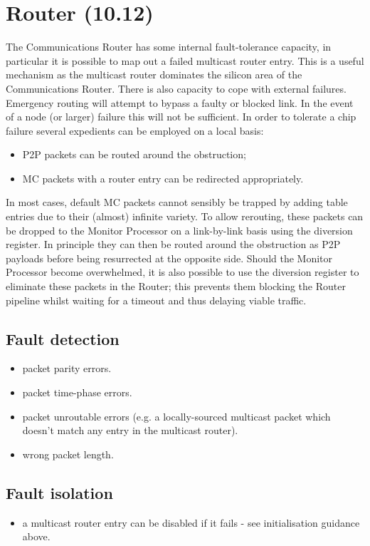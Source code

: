 \documentclass[oneside, a4paper, 11pt]{memoir}
\newenvironment{itmz}{
	\begin{itemize}
		\setlength{\itemsep}{0pt}
		\setlength{\parskip}{0pt}
	}{\end{itemize}}
\begin{document}
\section{Router (10.12)}
The Communications Router has some internal fault-tolerance capacity, in particular it is possible
to map out a failed multicast router entry. This is a useful mechanism as the multicast router
dominates the silicon area of the Communications Router.
There is also capacity to cope with external failures. Emergency routing will attempt to bypass a
faulty or blocked link. In the event of a node (or larger) failure this will not be sufficient. In order to
tolerate a chip failure several expedients can be employed on a local basis:
\begin{itmz}
\item P2P packets can be routed around the obstruction;
\item MC packets with a router entry can be redirected appropriately.
\end{itmz}
In most cases, default MC packets cannot sensibly be trapped by adding table entries due to their
(almost) infinite variety. To allow rerouting, these packets can be dropped to the Monitor Processor
on a link-by-link basis using the diversion register. In principle they can then be routed around the
obstruction as P2P payloads before being resurrected at the opposite side.
Should the Monitor Processor become overwhelmed, it is also possible to use the diversion register
to eliminate these packets in the Router; this prevents them blocking the Router pipeline whilst
waiting for a timeout and thus delaying viable traffic.
\subsection*{Fault detection}
\begin{itmz}
\item packet parity errors.
\item packet time-phase errors.
\item packet unroutable errors (e.g. a locally-sourced multicast packet which doesn’t match any entry
in the multicast router).
\item wrong packet length.
\end{itmz}
\subsection*{Fault isolation}
\begin{itmz}
\item a multicast router entry can be disabled if it fails - see initialisation guidance above.
\end{itmz}
\end{document}
